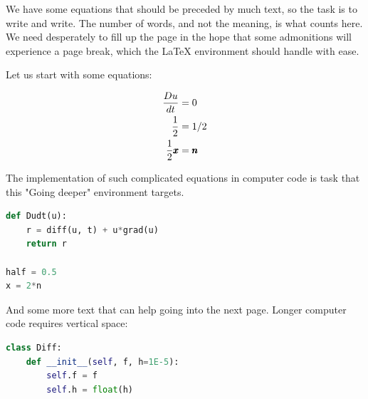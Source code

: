 \documentclass[%
oneside,                 %
final,                   %
10pt]{article}
\newenvironment{noticeshaded}
{\def\FrameCommand{\fboxsep=3mm\colorbox{yellowicon_notice_background}}
 \MakeFramed {\advance\hsize-\width \FrameRestore}}{\endMakeFramed}
\newenvironment{notice_yellowiconadmon}[1][Notice]{
\begin{noticeshaded}
\noindent
\begin{figure}
\vspace{-13pt}
\texttt{[image: latex\_figs/small\_yellow\_notice]}
\end{figure} \textbf{#1}\par
\nobreak\noindent\ignorespaces
}
{
\end{noticeshaded}
}
\begin{document}
\begin{notice_yellowiconadmon}
We have some equations that should be preceded by much text, so the
task is to write and write. The number of words, and not the
meaning, is what counts here. We need desperately to fill up the
page in the hope that some admonitions will experience a page break,
which the {\LaTeX} environment should handle with ease.

Let us start with some equations:

\begin{align*}
\frac{Du}{dt} &= 0
\\
\frac{1}{2} &= 1/2\\
\frac{1}{2}\pmb{x} &= \pmb{n}
\end{align*}

The implementation of such complicated equations in computer
code is task that this "Going deeper" environment targets.








\begin{lstlisting}[language=python,style=simple,xleftmargin=2mm]
def Dudt(u):
    r = diff(u, t) + u*grad(u)
    return r

half = 0.5
x = 2*n

\end{lstlisting}

And some more text that can help going into the next page.
Longer computer code requires vertical space:








































\begin{lstlisting}[language=python,style=simple,xleftmargin=2mm]
class Diff:
    def __init__(self, f, h=1E-5):
        self.f = f
        self.h = float(h)


\end{lstlisting}
\end{notice_yellowiconadmon}
\end{document}
